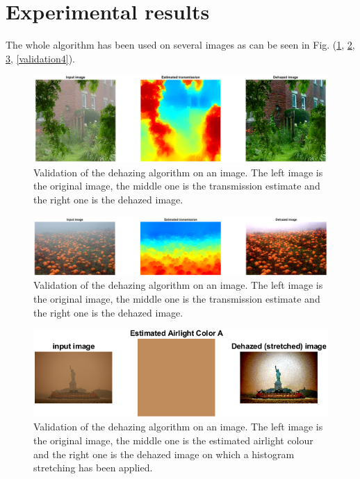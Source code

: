 \documentclass[conference]{IEEEtran}
\begin{document}
\section{Experimental results}
The whole algorithm has been used on several images as can be seen in Fig. (\ref{validation1}, \ref{validation2}, \ref{validation3}, \ref{validation4}).
\begin{figure}
    \centering
    \includegraphics[width=\linewidth]{img/validation1.png}
    \caption{Validation of the dehazing algorithm on an image. The left image is the original image, the middle one is the transmission estimate and the right one is the dehazed image.}
    \label{validation1}
\end{figure}
\begin{figure}
    \centering
    \includegraphics[width=\linewidth]{img/validation2.png}
    \caption{Validation of the dehazing algorithm on an image. The left image is the original image, the middle one is the transmission estimate and the right one is the dehazed image.}
    \label{validation2}
\end{figure}
\begin{figure}
    \centering
    \includegraphics[width=\linewidth]{img/validation3.png}
    \caption{Validation of the dehazing algorithm on an image. The left image is the original image, the middle one is the estimated airlight colour and the right one is the dehazed image on which a histogram stretching has been applied.}
    \label{validation3}
\end{figure}
\end{document}
